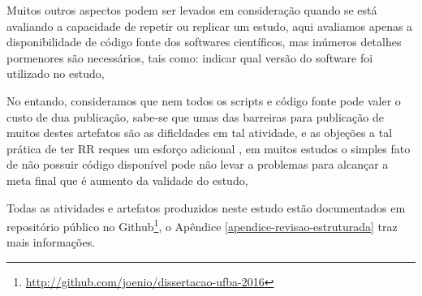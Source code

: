 
Muitos outros aspectos podem ser levados em consideração quando se está
avaliando a capacidade de repetir ou replicar um estudo, aqui avaliamos apenas
a disponibilidade de código fonte dos softwares científicos, mas inúmeros detalhes
pormenores são necessários, tais como: indicar qual versão do software foi
utilizado no estudo, 

No entando, consideramos que nem todos os scripts e código fonte pode
valer o custo de dua publicação, sabe-se que umas das barreiras para publicação
de muitos destes artefatos são as dificldades em tal atividade,
e as objeções a tal prática de ter RR reques um esforço adicional \cite{madeyski2017would},
em muitos
estudos o simples fato de não possuir código disponível pode não levar
a problemas para alcançar a meta final que é aumento da validade do estudo,


Todas as atividades e artefatos produzidos neste estudo estão documentados em
repositório público no
Github\footnote{\url{http://github.com/joenio/dissertacao-ufba-2016}}, o
Apêndice \ref{apendice-revisao-estruturada} traz mais informações.


